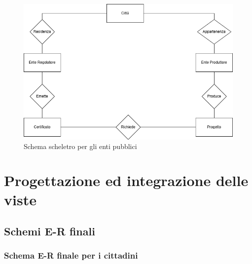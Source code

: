 \documentclass{article}
\begin{document}
\begin{figure}[H]
    \centering
    \includegraphics[width=15cm]{images/SchemaScheletroEnte.drawio}
    \caption{Schema scheletro per gli enti pubblici}
    \label{fig:schema-sostenibilita3}
\end{figure}

\newpage
\section{Progettazione ed integrazione delle viste}

\subsection{Schemi E-R finali}
 \subsubsection{Schema E-R finale per i cittadini}
\end{document}
